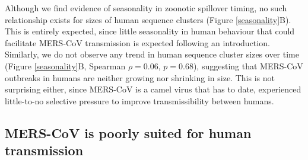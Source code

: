 \documentclass[9pt,lineno]{elife}
\begin{document}
Although we find evidence of seasonality in zoonotic spillover timing, no such relationship exists for sizes of human sequence clusters (Figure \ref{seasonality}B).
This is entirely expected, since little seasonality in human behaviour that could facilitate MERS-CoV transmission is expected following an introduction.
Similarly, we do not observe any trend in human sequence cluster sizes over time (Figure \ref{seasonality}B, Spearman $\rho = 0.06$, $p=0.68$), suggesting that MERS-CoV outbreaks in humans are neither growing nor shrinking in size.
This is not surprising either, since MERS-CoV is a camel virus that has to date, experienced little-to-no selective pressure to improve transmissibility between humans.


\subsection*{MERS-CoV is poorly suited for human transmission}
\end{document}
